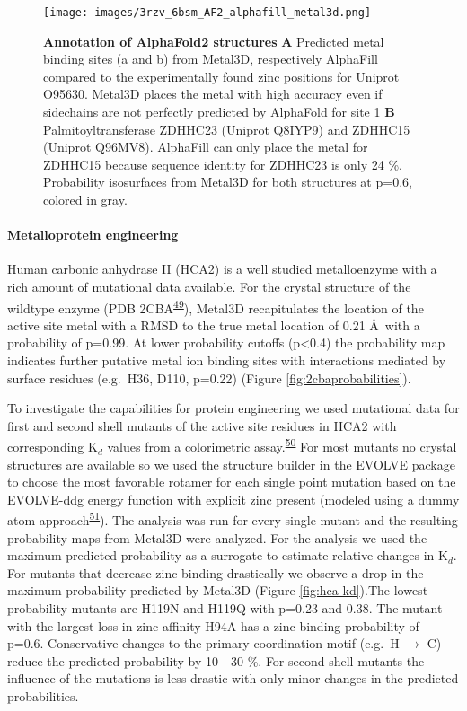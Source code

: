 \documentclass[ lineno,
  9pt]{elife}
\begin{document}
\begin{figure}
\hypertarget{fig:alphafold}{%
\centering
\texttt{[image: images/3rzv\_6bsm\_AF2\_alphafill\_metal3d.png]}
\caption{\textbf{Annotation of AlphaFold2 structures} \textbf{A} Predicted metal binding sites (a and b) from Metal3D, respectively AlphaFill compared to the experimentally found zinc positions for Uniprot O95630. Metal3D places the metal with high accuracy even if sidechains are not perfectly predicted by AlphaFold for site 1 \textbf{B} Palmitoyltransferase ZDHHC23 (Uniprot Q8IYP9) and ZDHHC15 (Uniprot Q96MV8). AlphaFill can only place the metal for ZDHHC15 because sequence identity for ZDHHC23 is only 24 \%. Probability isosurfaces from Metal3D for both structures at p=0.6, colored in gray.}\label{fig:alphafold}
}
\end{figure}

\hypertarget{metalloprotein-engineering}{%
\paragraph{Metalloprotein engineering}\label{metalloprotein-engineering}}

Human carbonic anhydrase II (HCA2) is a well studied metalloenzyme with a rich amount of mutational data available. For the crystal structure of the wildtype enzyme (PDB 2CBA\textsuperscript{\protect\hyperlink{ref-jyFnBdWm}{49}}), Metal3D recapitulates the location of the active site metal with a RMSD to the true metal location of 0.21 \AA\, with a probability of p=0.99. At lower probability cutoffs (p\textless0.4) the probability map indicates further putative metal ion binding sites with interactions mediated by surface residues (e.g.~H36, D110, p=0.22) (Figure \ref{fig:2cbaprobabilities}).

To investigate the capabilities for protein engineering we used mutational data for first and second shell mutants of the active site residues in HCA2 with corresponding K$_d$ values from a colorimetric assay.\textsuperscript{\protect\hyperlink{ref-13XuOF3Jj}{50}} For most mutants no crystal structures are available so we used the structure builder in the EVOLVE package to choose the most favorable rotamer for each single point mutation based on the EVOLVE-ddg energy function with explicit zinc present (modeled using a dummy atom approach\textsuperscript{\protect\hyperlink{ref-pchdLF0k}{51}}). The analysis was run for every single mutant and the resulting probability maps from Metal3D were analyzed. For the analysis we used the maximum predicted probability as a surrogate to estimate relative changes in K$_d$. For mutants that decrease zinc binding drastically we observe a drop in the maximum probability predicted by Metal3D (Figure \ref{fig:hca-kd}).The lowest probability mutants are H119N and H119Q with p=0.23 and 0.38. The mutant with the largest loss in zinc affinity H94A has a zinc binding probability of p=0.6. Conservative changes to the primary coordination motif (e.g.~H $\rightarrow$ C) reduce the predicted probability by 10 - 30 \%. For second shell mutants the influence of the mutations is less drastic with only minor changes in the predicted probabilities.
\end{document}
